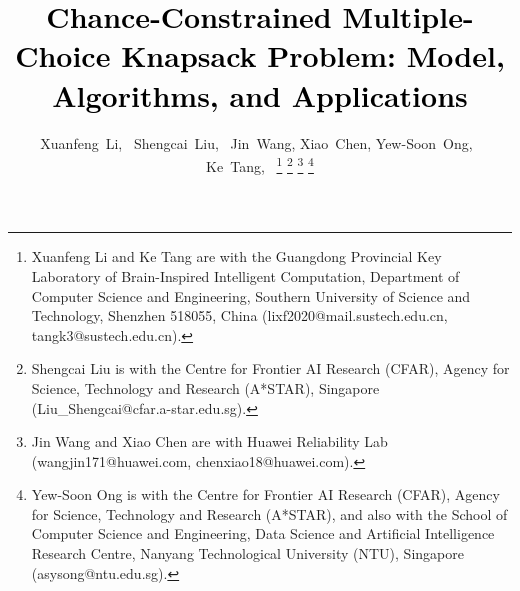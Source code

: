 \documentclass[lettersize,journal]{IEEEtran}
\begin{document}
%
\title{\textcolor{black}{Chance-Constrained Multiple-Choice Knapsack Problem: Model, Algorithms, and Applications}}
%
%
%

\author{Xuanfeng~Li,~
        Shengcai~Liu,~
        Jin~Wang,
        Xiao~Chen,
        Yew-Soon~Ong,~
        Ke~Tang,~
\thanks{Xuanfeng Li and Ke Tang are with the Guangdong Provincial Key Laboratory of Brain-Inspired Intelligent Computation, Department of
Computer Science and Engineering, Southern University of Science and Technology, Shenzhen 518055, China (lixf2020@mail.sustech.edu.cn, tangk3@sustech.edu.cn).}
\thanks{Shengcai Liu is with the Centre for Frontier AI Research (CFAR), Agency for Science, Technology and Research (A*STAR), Singapore (Liu\_Shengcai@cfar.a-star.edu.sg).}
\thanks{Jin Wang and Xiao Chen are with Huawei Reliability Lab (wangjin171@huawei.com, chenxiao18@huawei.com).}
\thanks{Yew-Soon Ong is with the Centre for Frontier AI Research (CFAR), Agency for Science, Technology and Research (A*STAR), and also with the School of Computer Science and Engineering, Data Science and Artificial Intelligence Research Centre, Nanyang Technological University (NTU), Singapore (asysong@ntu.edu.sg).}
}
\end{document}

